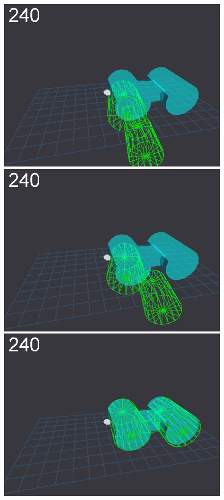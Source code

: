 \begin{figure}[t]
{\includegraphics[width=\imgCXwid]{./C5_1exp_6_4}
\includegraphics[width=\imgCXwid]{./C5_2exp_6_4}
\includegraphics[width=\imgCXwid]{./C5_3exp_6_4}
}
\end{figure}
